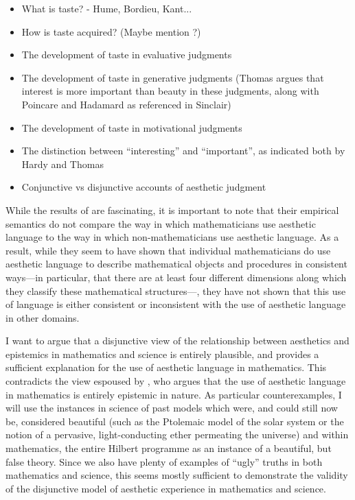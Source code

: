 \documentclass[a4paper,man,natbib]{apa6}
\begin{document}
\begin{itemize}
      \item What is taste? - Hume, Bordieu, Kant...
      \item How is taste acquired? (Maybe mention \cite{mcallister_mathematical_2005}?)
      \item The development of taste in evaluative judgments
      \item The development of taste in generative judgments (Thomas argues that 
      interest is more important than beauty in these judgments, along with 
      Poincare and Hadamard as referenced in Sinclair)
      \item The development of taste in motivational judgments
      \item The distinction between ``interesting'' and ``important'', as indicated
      both by Hardy and Thomas
      \item Conjunctive vs disjunctive accounts of aesthetic judgment
\end{itemize}





While the results of \cite{inglis_beauty_2015} are fascinating, it is important to note that their empirical
semantics do not compare the way in which mathematicians use aesthetic language to the way in which non-mathematicians
use aesthetic language. As a result, while they seem to have shown that individual mathematicians do use aesthetic
language to describe mathematical objects and procedures in consistent ways---in particular, that there are
at least four different dimensions along which they classify these mathematical structures---, they have not shown that this use
of language is either consistent or inconsistent with the use of aesthetic language in other domains. 


I want to argue that a disjunctive view of the relationship between aesthetics and epistemics in mathematics
and science is entirely plausible, and provides a sufficient explanation for the use of aesthetic language
in mathematics. This contradicts the view espoused by \cite{todd_unmasking_2008}, who argues that the
use of aesthetic language in mathematics is entirely epistemic in nature. As particular counterexamples,
I will use the instances in science of past models which were, and could still now be, considered beautiful (such
as the Ptolemaic model of the solar system or the notion of a pervasive, light-conducting ether permeating the
universe) and within mathematics, the entire Hilbert programme as an instance of a beautiful, but false theory.
Since we also have plenty of examples of ``ugly'' truths in both mathematics and science, this seems mostly sufficient
to demonstrate the validity of the disjunctive model of aesthetic experience in mathematics and science.
\end{document}
